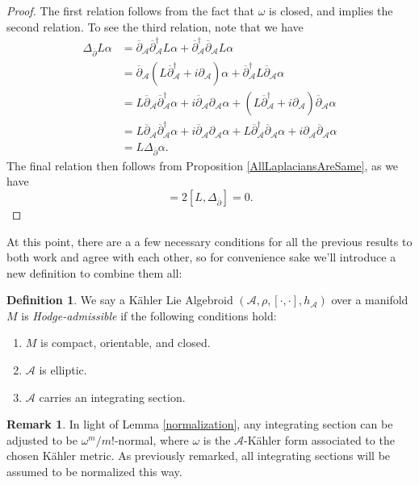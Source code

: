 \documentclass{amsart}
\newcommand{\p}{\partial}
\theoremstyle{definition}
\newtheorem{definition}[theorem]{Definition}
\newtheorem{remark}[theorem]{Remark}
\newcommand{\A}{\mathcal{A}}
\theoremstyle{definition}
\begin{document}
\begin{proof}
    The first relation follows from the fact that $\omega$ is closed, and implies the second relation.  To see the third relation, note that we have
    \begin{align*}
        \Delta_{\overline{\p}}L \alpha &= \overline{\p}_\A\overline{\p}^\dagger_\A L \alpha +  \overline{\p}^\dagger_\A\overline{\p}_\A L\alpha  \\
        &=\overline{\p}_\A(L \overline{\p}_\A^\dagger +i \p_\A)\alpha + \overline{\p}_\A^\dagger L\overline{\p}_\A\alpha \\
        &=L\overline{\p}_\A \overline{\p}_\A^\dagger \alpha + i\overline{\p}_\A\p_\A \alpha + (L \overline{\p}^\dagger_\A+ i\p_\A) \overline{\p}_\A\alpha \\
        &= L\overline{\p}_\A \overline{\p}_\A^\dagger \alpha + i \overline{\p}_\A \p_\A \alpha + L \overline{\p}_\A^\dagger \overline{\p}_\A \alpha + i \p_\A \overline{\p}_\A \alpha \\
        &=L \Delta_{\overline{\p}}\alpha.
    \end{align*}
    The final relation then follows from Proposition \ref{AllLaplaciansAreSame}, as we have
    \begin{equation*}
        [L,\Delta] =2[L,\Delta_{\overline{\p}}]=0.
    \end{equation*}
\end{proof}
 At this point, there are a a few necessary conditions for all the previous results to both work and agree with each other, so for convenience sake we'll introduce a new definition to combine them all:
\begin{definition}
    We say a K\"ahler Lie Algebroid $(\A,\rho ,[\cdot , \cdot], h_\A)$ over a manifold $M$ is \textit{Hodge-admissible} if the following conditions hold:
    \begin{enumerate}
        \item $M$ is compact, orientable, and closed.
        \item $\A$ is elliptic.
        \item $\A$ carries an integrating section.
    \end{enumerate}
\end{definition}
\begin{remark}
    In light of Lemma \ref{normalization}, any integrating section can be adjusted to be $\omega^m/m!$-normal, where $\omega$ is the $\A$-Kähler form associated to the chosen Kähler metric. As previously remarked, all integrating sections will be assumed to be normalized this way.
\end{remark}
\end{document}
